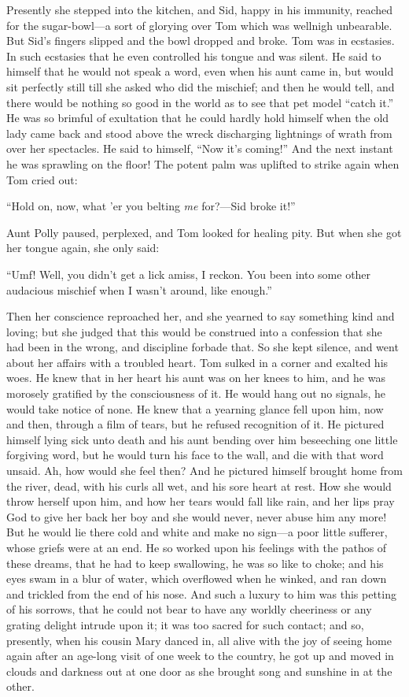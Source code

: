 \documentclass{book}
\begin{document}
Presently she stepped into the kitchen, and Sid, happy in his immunity, reached for the sugar-bowl—a sort of glorying over Tom which was wellnigh unbearable. But Sid’s fingers slipped and the bowl dropped and broke. Tom was in ecstasies. In such ecstasies that he even controlled his tongue and was silent. He said to himself that he would not speak a word, even when his aunt came in, but would sit perfectly still till she asked who did the mischief; and then he would tell, and there would be nothing so good in the world as to see that pet model “catch it.” He was so brimful of exultation that he could hardly hold himself when the old lady came back and stood above the wreck discharging lightnings of wrath from over her spectacles. He said to himself, “Now it’s coming!” And the next instant he was sprawling on the floor! The potent palm was uplifted to strike again when Tom cried out:

“Hold on, now, what ’er you belting \emph{me} for?—Sid broke it!”

Aunt Polly paused, perplexed, and Tom looked for healing pity. But when she got her tongue again, she only said:

“Umf! Well, you didn’t get a lick amiss, I reckon. You been into some other audacious mischief when I wasn’t around, like enough.”

Then her conscience reproached her, and she yearned to say something kind and loving; but she judged that this would be construed into a confession that she had been in the wrong, and discipline forbade that. So she kept silence, and went about her affairs with a troubled heart. Tom sulked in a corner and exalted his woes. He knew that in her heart his aunt was on her knees to him, and he was morosely gratified by the consciousness of it. He would hang out no signals, he would take notice of none. He knew that a yearning glance fell upon him, now and then, through a film of tears, but he refused recognition of it. He pictured himself lying sick unto death and his aunt bending over him beseeching one little forgiving word, but he would turn his face to the wall, and die with that word unsaid. Ah, how would she feel then? And he pictured himself brought home from the river, dead, with his curls all wet, and his sore heart at rest. How she would throw herself upon him, and how her tears would fall like rain, and her lips pray God to give her back her boy and she would never, never abuse him any more! But he would lie there cold and white and make no sign—a poor little sufferer, whose griefs were at an end. He so worked upon his feelings with the pathos of these dreams, that he had to keep swallowing, he was so like to choke; and his eyes swam in a blur of water, which overflowed when he winked, and ran down and trickled from the end of his nose. And such a luxury to him was this petting of his sorrows, that he could not bear to have any worldly cheeriness or any grating delight intrude upon it; it was too sacred for such contact; and so, presently, when his cousin Mary danced in, all alive with the joy of seeing home again after an age-long visit of one week to the country, he got up and moved in clouds and darkness out at one door as she brought song and sunshine in at the other.
\end{document}
